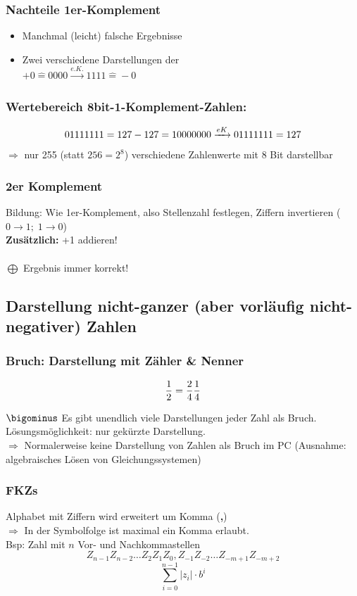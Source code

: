 \documentclass[10pt,a4paper]{scrartcl}
\begin{document}
\subsubsection*{Nachteile 1er-Komplement}
\begin{itemize}
	\item Manchmal (leicht) falsche Ergebnisse
	\item Zwei verschiedene Darstellungen der \grqq{} \\
	$  +0 \hat{=} 0000 \xrightarrow{e.K.} 1111 \hat{=} -0 $
\end{itemize}
\subsubsection*{Wertebereich 8bit-1-Komplement-Zahlen:}
$$
01111111 = 127 \\
-127 = 10000000 \xrightarrow{eK} 01111111 = 127
$$
$\Rightarrow$ nur 255 (statt $ 256 = 2^8 $) verschiedene Zahlenwerte mit 8 Bit darstellbar

\subsubsection{2er Komplement}
Bildung: Wie 1er-Komplement, also Stellenzahl festlegen, Ziffern invertieren ($ 0 \rightarrow 1; \; 1\rightarrow 0 $)\\
\textbf{Zusätzlich:} +1 addieren!\\
\\
$ \bigoplus $ Ergebnis immer korrekt!

\subsection{Darstellung nicht-ganzer (aber vorläufig nicht-negativer) Zahlen}
\subsubsection{Bruch: Darstellung mit Zähler \& Nenner}
$$
\dfrac{1}{2} = \dfrac{2}{4} \\
\dfrac{1}{4}
$$

$ \bigominus $ Es gibt unendlich viele Darstellungen jeder Zahl als Bruch. Lösungsmöglichkeit: nur gekürzte Darstellung.\\
$ \Rightarrow $ Normalerweise keine Darstellung von Zahlen als Bruch im PC (Ausnahme: algebraisches Lösen von Gleichungssystemen)

\subsubsection{\aclp{FKZ}}
Alphabet mit Ziffern wird erweitert um \glqq Komma\grqq{} (\glqq \textbf{,}\grqq)\\
$ \Rightarrow $ In der Symbolfolge ist maximal ein Komma erlaubt. \\
Bsp: Zahl mit $n$ Vor- und Nachkommastellen
$$
Z_{n-1} Z_{n-2}\ldots Z_2 Z_1 Z_0,Z_{-1} Z_{-2} \ldots Z_{-m+1} Z_{-m+2}
$$
$$
\sum_{i=0}^{n-1} |z_i|\cdot b^i
$$
\end{document}
